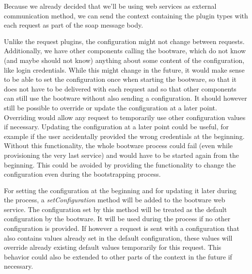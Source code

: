 Because we already decided that we'll be using web services as external communication method, we can send the context containing the plugin types with each request as part of the soap message body.

Unlike the request plugins, the configuration might not change between requests.
Additionally, we have other components calling the bootware, which do not know (and maybe should not know) anything about some content of the configuration, like login credentials.
While this might change in the future, it would make sense to be able to set the configuration once when starting the bootware, so that it does not have to be delivered with each request and so that other components can still use the bootware without also sending a configuration.
It should however still be possible to override or update the configuration at a later point.
Overriding would allow any request to temporarily use other configuration values if necessary.
Updating the configuration at a later point could be useful, for example if the user accidentally provided the wrong credentials at the beginning.
Without this functionality, the whole bootware process could fail (even while provisioning the very last service) and would have to be started again from the beginning.
This could be avoided by providing the functionality to change the configuration even during the bootstrapping process.

For setting the configuration at the beginning and for updating it later during the process, a \textit{setConfiguration} method will be added to the bootware web service.
The configuration set by this method will be treated as the default configuration by the bootware.
It will be used during the process if no other configuration is provided.
If however a request is sent with a configuration that also contains values already set in the default configuration, these values will override already existing default values temporarily for this request.
This behavior could also be extended to other parts of the context in the future if necessary.
